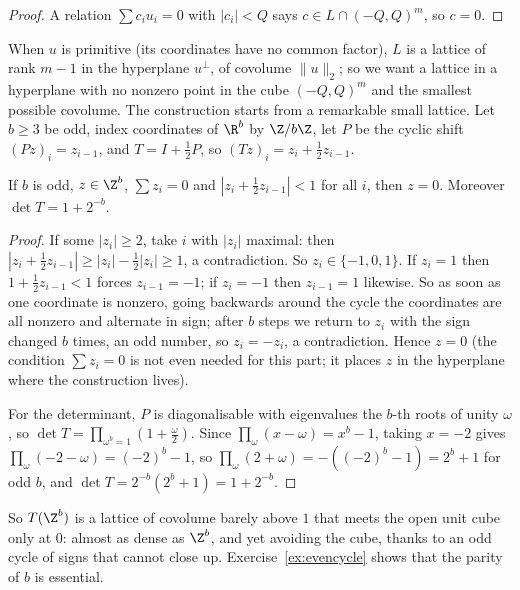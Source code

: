 \begin{proof}
A relation $\sum c_iu_i=0$ with $|c_i|<Q$ says $c\in L\cap(-Q,Q)^m$, so $c=0$.
\end{proof}

When $u$ is primitive (its coordinates have no common factor), $L$ is a lattice of rank $m-1$ in the hyperplane $u^\perp$, of covolume
$\|u\|_2$; so we want a lattice in a hyperplane with no nonzero point in the cube $(-Q,Q)^m$ and the smallest possible covolume. The
construction starts from a remarkable small lattice. Let $b\ge3$ be odd, index coordinates of $\R^b$ by $\Z/b\Z$, let $P$ be the cyclic shift
$(Pz)_i=z_{i-1}$, and $T=I+\frac12P$, so $(Tz)_i=z_i+\frac12z_{i-1}$.

\begin{lemma}\label{lem:oddcycle}
If $b$ is odd, $z\in\Z^b$, $\sum z_i=0$ and $|z_i+\frac12z_{i-1}|<1$ for all $i$, then $z=0$. Moreover $\det T=1+2^{-b}$.
\end{lemma}

\begin{proof}
If some $|z_i|\ge2$, take $i$ with $|z_i|$ maximal: then $|z_i+\frac12z_{i-1}|\ge|z_i|-\frac12|z_i|\ge1$, a contradiction. So $z_i\in\{-1,0,1\}$. If $z_i=1$ then
$1+\frac12z_{i-1}<1$ forces $z_{i-1}=-1$; if $z_i=-1$ then $z_{i-1}=1$ likewise. So as soon as one coordinate is nonzero, going backwards around the cycle
the coordinates are all nonzero and alternate in sign; after $b$ steps we return to $z_i$ with the sign changed $b$ times, an odd number, so
$z_i=-z_i$, a contradiction. Hence $z=0$ (the condition $\sum z_i=0$ is not even needed for this part; it places $z$ in the hyperplane where the
construction lives).

For the determinant, $P$ is diagonalisable with eigenvalues the $b$-th roots of unity $\omega$, so $\det T=\prod_{\omega^b=1}(1+\frac\omega2)$. Since
$\prod_\omega(x-\omega)=x^b-1$, taking $x=-2$ gives $\prod_\omega(-2-\omega)=(-2)^b-1$, so $\prod_\omega(2+\omega)=-((-2)^b-1)=2^b+1$ for odd $b$, and
$\det T=2^{-b}(2^b+1)=1+2^{-b}$.
\end{proof}

So $T(\Z^b)$ is a lattice of covolume barely above $1$ that meets the open unit cube only at $0$: almost as dense as $\Z^b$, and yet
avoiding the cube, thanks to an odd cycle of signs that cannot close up. Exercise~\ref{ex:evencycle} shows that the parity of $b$ is essential.

